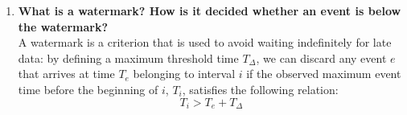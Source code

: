 \documentclass{article}
\begin{document}
\begin{enumerate}
    \item \textbf{What is a watermark? How is it decided whether an event is below the watermark?}
    \\ \noindent
    A watermark is a criterion that is used to avoid waiting indefinitely for late data: by defining a maximum threshold time $T_\Delta$, we can discard any event $e$ that arrives at time $T_e$ belonging to interval $i$ if the observed maximum event time before the beginning of $i$, $T_i$, satisfies the following relation:
    $$T_i > T_e + T_\Delta $$
\end{enumerate}
\end{document}
